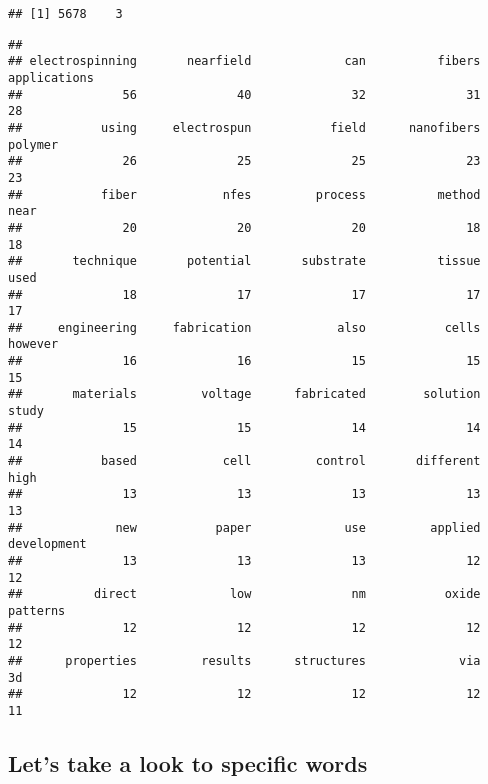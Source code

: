\documentclass[
  a4paper]{article}
\newenvironment{Shaded}{\begin{snugshade}}{\end{snugshade}}
\newcommand{\CommentTok}[1]{\textcolor[rgb]{0.56,0.35,0.01}{\textit{#1}}}
\newcommand{\DataTypeTok}[1]{\textcolor[rgb]{0.13,0.29,0.53}{#1}}
\newcommand{\DecValTok}[1]{\textcolor[rgb]{0.00,0.00,0.81}{#1}}
\newcommand{\KeywordTok}[1]{\textcolor[rgb]{0.13,0.29,0.53}{\textbf{#1}}}
\newcommand{\NormalTok}[1]{#1}
\newcommand{\OperatorTok}[1]{\textcolor[rgb]{0.81,0.36,0.00}{\textbf{#1}}}
\begin{document}
\begin{verbatim}
## [1] 5678    3
\end{verbatim}

\begin{Shaded}
\end{Shaded}

\begin{verbatim}
## 
## electrospinning       nearfield             can          fibers    applications 
##              56              40              32              31              28 
##           using     electrospun           field      nanofibers         polymer 
##              26              25              25              23              23 
##           fiber            nfes         process          method            near 
##              20              20              20              18              18 
##       technique       potential       substrate          tissue            used 
##              18              17              17              17              17 
##     engineering     fabrication            also           cells         however 
##              16              16              15              15              15 
##       materials         voltage      fabricated        solution           study 
##              15              15              14              14              14 
##           based            cell         control       different            high 
##              13              13              13              13              13 
##             new           paper             use         applied     development 
##              13              13              13              12              12 
##          direct             low              nm           oxide        patterns 
##              12              12              12              12              12 
##      properties         results      structures             via              3d 
##              12              12              12              12              11
\end{verbatim}

\hypertarget{lets-take-a-look-to-specific-words}{%
\subsection{Let's take a look to specific
words}\label{lets-take-a-look-to-specific-words}}
\end{document}
